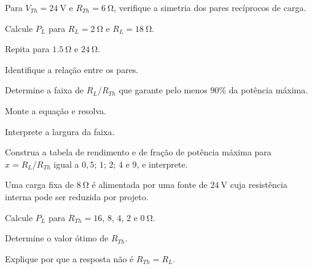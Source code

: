 \blocoaprofundamento
\begin{questao}[3]{}

Para $V_{Th}=\SI{24}{\volt}$ e $R_{Th}=\SI{6}{\ohm}$, verifique a simetria dos
pares recíprocos de carga.
\begin{itensq}
\item Calcule $P_L$ para $R_L=\SI{2}{\ohm}$ e $R_L=\SI{18}{\ohm}$.
\item Repita para $\SI{1.5}{\ohm}$ e $\SI{24}{\ohm}$.
\item Identifique a relação entre os pares.
\end{itensq}


\end{questao}
\begin{questao}[3]{}

Determine a faixa de $R_L/R_{Th}$ que garante pelo menos $90\%$ da potência
máxima.
\begin{itensq}
\item Monte a equação e resolva.
\item Interprete a largura da faixa.
\end{itensq}


\end{questao}
\begin{questao}[3]{}

Construa a tabela de rendimento e de fração de potência máxima para
$x=R_L/R_{Th}$ igual a $0{,}5$; $1$; $2$; $4$ e $9$, e interprete.


\end{questao}
\begin{questao}[3]{}

Uma carga fixa de $\SI{8}{\ohm}$ é alimentada por uma fonte de
$\SI{24}{\volt}$ cuja resistência interna pode ser reduzida por projeto.
\begin{itensq}
\item Calcule $P_L$ para $R_{Th}=16$, $8$, $4$, $2$ e $\SI{0}{\ohm}$.
\item Determine o valor ótimo de $R_{Th}$.
\item Explique por que a resposta não é $R_{Th}=R_L$.
\end{itensq}


\end{questao}
